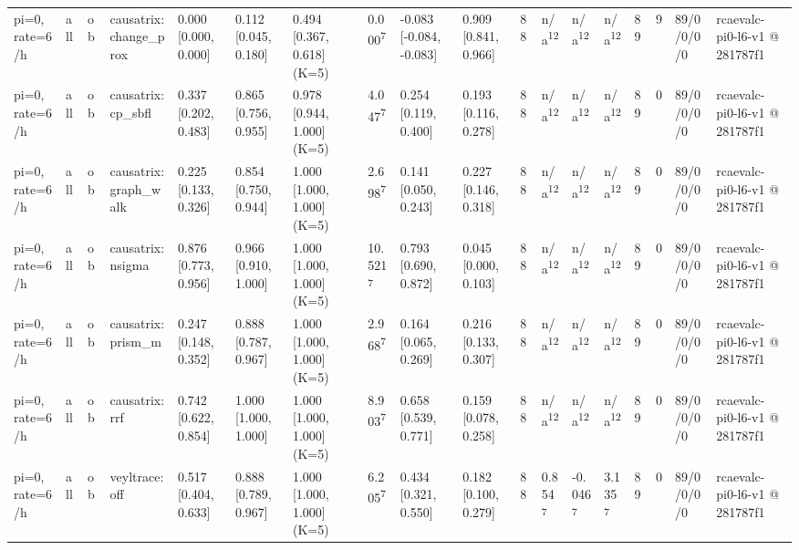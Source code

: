 \begin{table}[t]
\begin{tabular}{llllllllllllllllll}
pi=0, rate=6/h & all & ob & causatrix:change\_prox & 0.000 [0.000, 0.000] & 0.112 [0.045, 0.180] & 0.494 [0.367, 0.618] (K=5) & 0.000\textsuperscript{7} & -0.083 [-0.084, -0.083] & 0.909 [0.841, 0.966] & 88 & n/a\textsuperscript{12} & n/a\textsuperscript{12} & n/a\textsuperscript{12} & 89 & 9 & 89/0/0/0/0 & rcaevalc-pi0-l6-v1 @ 281787f1 \\
pi=0, rate=6/h & all & ob & causatrix:cp\_sbfl & 0.337 [0.202, 0.483] & 0.865 [0.756, 0.955] & 0.978 [0.944, 1.000] (K=5) & 4.047\textsuperscript{7} & 0.254 [0.119, 0.400] & 0.193 [0.116, 0.278] & 88 & n/a\textsuperscript{12} & n/a\textsuperscript{12} & n/a\textsuperscript{12} & 89 & 0 & 89/0/0/0/0 & rcaevalc-pi0-l6-v1 @ 281787f1 \\
pi=0, rate=6/h & all & ob & causatrix:graph\_walk & 0.225 [0.133, 0.326] & 0.854 [0.750, 0.944] & 1.000 [1.000, 1.000] (K=5) & 2.698\textsuperscript{7} & 0.141 [0.050, 0.243] & 0.227 [0.146, 0.318] & 88 & n/a\textsuperscript{12} & n/a\textsuperscript{12} & n/a\textsuperscript{12} & 89 & 0 & 89/0/0/0/0 & rcaevalc-pi0-l6-v1 @ 281787f1 \\
pi=0, rate=6/h & all & ob & causatrix:nsigma & 0.876 [0.773, 0.956] & 0.966 [0.910, 1.000] & 1.000 [1.000, 1.000] (K=5) & 10.521\textsuperscript{7} & 0.793 [0.690, 0.872] & 0.045 [0.000, 0.103] & 88 & n/a\textsuperscript{12} & n/a\textsuperscript{12} & n/a\textsuperscript{12} & 89 & 0 & 89/0/0/0/0 & rcaevalc-pi0-l6-v1 @ 281787f1 \\
pi=0, rate=6/h & all & ob & causatrix:prism\_m & 0.247 [0.148, 0.352] & 0.888 [0.787, 0.967] & 1.000 [1.000, 1.000] (K=5) & 2.968\textsuperscript{7} & 0.164 [0.065, 0.269] & 0.216 [0.133, 0.307] & 88 & n/a\textsuperscript{12} & n/a\textsuperscript{12} & n/a\textsuperscript{12} & 89 & 0 & 89/0/0/0/0 & rcaevalc-pi0-l6-v1 @ 281787f1 \\
pi=0, rate=6/h & all & ob & causatrix:rrf & 0.742 [0.622, 0.854] & 1.000 [1.000, 1.000] & 1.000 [1.000, 1.000] (K=5) & 8.903\textsuperscript{7} & 0.658 [0.539, 0.771] & 0.159 [0.078, 0.258] & 88 & n/a\textsuperscript{12} & n/a\textsuperscript{12} & n/a\textsuperscript{12} & 89 & 0 & 89/0/0/0/0 & rcaevalc-pi0-l6-v1 @ 281787f1 \\
pi=0, rate=6/h & all & ob & veyltrace:off & 0.517 [0.404, 0.633] & 0.888 [0.789, 0.967] & 1.000 [1.000, 1.000] (K=5) & 6.205\textsuperscript{7} & 0.434 [0.321, 0.550] & 0.182 [0.100, 0.279] & 88 & 0.854\textsuperscript{7} & -0.046\textsuperscript{7} & 3.135\textsuperscript{7} & 89 & 0 & 89/0/0/0/0 & rcaevalc-pi0-l6-v1 @ 281787f1 \\

\end{tabular}
\end{table}

